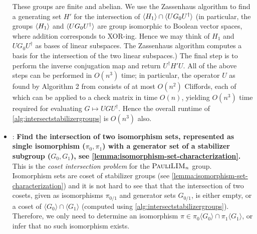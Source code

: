 \begin{itemize}
        These groups are finite and abelian.
        We use the Zassenhaus algorithm \cite{LUKS1997335} to find a generating set $H'$ for the intersection of $\braket{H_1}\cap \braket{UG_0 U^{\dagger}}$ (in particular, the groups $\braket{H_1}$ and $\braket{UG_0U^\dagger}$ are group isomorphic to Boolean vector spaces, where addition corresponds to XOR-ing. Hence we may think of $H_1$ and $UG_0 U^{\dagger}$ as bases of linear subspaces. The Zassenhaus algorithm computes a basis for the intersection of the two linear subspaces.)
        The final step is to perform the inverse conjugation map and return $U^{\dagger} H' U$.
        All of the above steps can be performed in $O(n^3)$ time; in particular, the operator $U$ as found by Algorithm 2 from \cite{garcia2012efficient} consists of at most $O(n^2)$ Cliffords, each of which can be applied to a check matrix in time $O(n)$, yielding $O(n^3)$ time required for evaluating $G \mapsto U G U^{\dagger}$.
        Hence the overall runtime of \autoref{alg:intersectstabilizergroups} is $O(n^3)$ also.
    \item \findisomorphismsetintersection: \textbf{Find the intersection of two isomorphism sets, represented as single isomorphism ($\pi_0, \pi_1$) with a generator set of a stabilizer subgroup ($G_0, G_1$), see \autoref{lemma:isomorphism-set-characterization}.} 
        This is the \emph{coset intersection problem} for the $\textnormal{\sc PauliLIM}_n$ group.
        Isomorphism sets are coset of stabilizer groups (see \autoref{lemma:isomorphism-set-characterization}) and it is not hard to see that that the intersection of two cosets, given as isomorphisms $\pi_{0/1}$ and generator sets $G_{0/1}$, is either empty, or a coset of $\langle G_0 \rangle \cap \langle G_1 \rangle$ (computed using \autoref{alg:intersectstabilizergroups}).
        Therefore, we only need to determine an isomorphism $\pi \in \pi_0 \langle G_0\rangle \cap \pi_1 \langle G_1 \rangle$, or infer that no such isomorphism exists.


\end{itemize}
